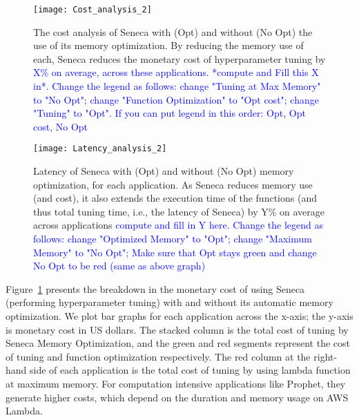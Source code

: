 



\begin{figure}[t] \centering 
\texttt{[image: Cost\_analysis\_2]}
\caption{ The cost analysis of Seneca with (Opt) and without (No Opt) the use of its memory optimization. 
By reducing the memory use of each, Seneca reduces the monetary cost of hyperparameter tuning by \textcolor{blue}{X\% on average, across these applications.  *compute and Fill this X in*.}
\textcolor{blue}{Change the legend as follows: change "Tuning at Max Memory" to "No Opt"; change "Function Optimization" to "Opt cost"; change "Tuning" to "Opt". If you can put legend in this order: Opt, Opt cost, No Opt} 
\label{fig:cost_analysis}}
\vspace{-0.2in}
\end{figure}

\begin{figure}[t] \centering 
\texttt{[image: Latency\_analysis\_2]}
\caption{Latency of Seneca with (Opt) and without (No Opt) memory optimization, for each application. As Seneca reduces memory use (and cost), it also extends the execution time of the functions (and thus total tuning time, i.e., the latency of Seneca) by Y\% on average across applications \textcolor{blue}{compute and fill in Y here.}
\textcolor{blue}{Change the legend as follows: change "Optimized Memory" to "Opt"; change "Maximum Memory" to "No Opt"; Make sure that Opt stays green and change No Opt to be red (same as above graph)} 
\label{fig:latency_analysis}}
\vspace{-0.2in}
\end{figure}

Figure~\ref{fig:cost_analysis} presents the breakdown in the monetary cost of 
using Seneca (performing hyperparameter tuning) with and without its automatic memory optimization.  
We plot bar graphs for each application across the x-axis; the y-axis is monetary cost in US dollars. The stacked column is the total cost of tuning by Seneca Memory Optimization, and the green and red segments represent the cost of tuning and function optimization respectively. The red column at the right-hand side of each application is the total cost of tuning by using lambda function at maximum memory. For computation intensive applications like Prophet, they generate higher costs, which depend on the duration and memory usage on AWS Lambda. %


